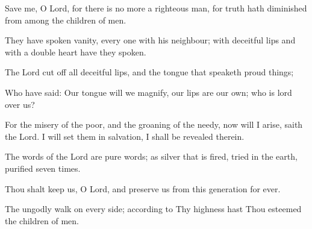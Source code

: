 Save me, O Lord, for there is no more a righteous man, for truth hath diminished from among the children of men.

They have spoken vanity, every one with his neighbour; with deceitful lips and with a double heart have they spoken.

The Lord cut off all deceitful lips, and the tongue that speaketh proud things;

Who have said: Our tongue will we magnify, our lips are our own; who is lord over us?

For the misery of the poor, and the groaning of the needy, now will I arise, saith the Lord. I will set them in salvation, I shall be revealed therein.

The words of the Lord are pure words; as silver that is fired, tried in the earth, purified seven times.

Thou shalt keep us, O Lord, and preserve us from this generation for ever.

The ungodly walk on every side; according to Thy highness hast Thou esteemed the children of men.

